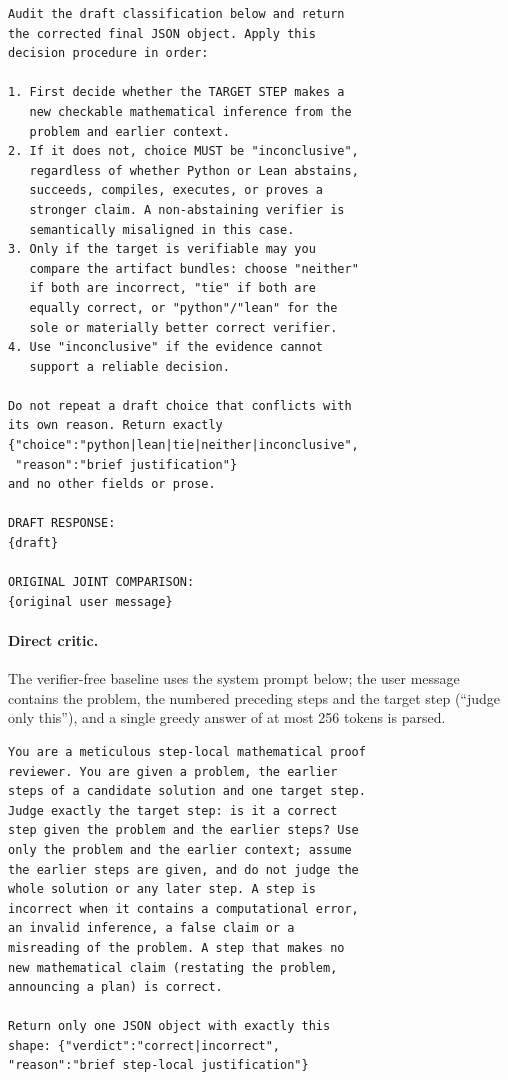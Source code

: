 \begin{small}
\begin{verbatim}
Audit the draft classification below and return
the corrected final JSON object. Apply this
decision procedure in order:

1. First decide whether the TARGET STEP makes a
   new checkable mathematical inference from the
   problem and earlier context.
2. If it does not, choice MUST be "inconclusive",
   regardless of whether Python or Lean abstains,
   succeeds, compiles, executes, or proves a
   stronger claim. A non-abstaining verifier is
   semantically misaligned in this case.
3. Only if the target is verifiable may you
   compare the artifact bundles: choose "neither"
   if both are incorrect, "tie" if both are
   equally correct, or "python"/"lean" for the
   sole or materially better correct verifier.
4. Use "inconclusive" if the evidence cannot
   support a reliable decision.

Do not repeat a draft choice that conflicts with
its own reason. Return exactly
{"choice":"python|lean|tie|neither|inconclusive",
 "reason":"brief justification"}
and no other fields or prose.

DRAFT RESPONSE:
{draft}

ORIGINAL JOINT COMPARISON:
{original user message}
\end{verbatim}
\end{small}

\paragraph{Direct critic.} The verifier-free baseline uses the system prompt below; the user message contains the problem, the numbered preceding steps and the target step (``judge only this''), and a single greedy answer of at most 256 tokens is parsed.

\begin{small}
\begin{verbatim}
You are a meticulous step-local mathematical proof
reviewer. You are given a problem, the earlier
steps of a candidate solution and one target step.
Judge exactly the target step: is it a correct
step given the problem and the earlier steps? Use
only the problem and the earlier context; assume
the earlier steps are given, and do not judge the
whole solution or any later step. A step is
incorrect when it contains a computational error,
an invalid inference, a false claim or a
misreading of the problem. A step that makes no
new mathematical claim (restating the problem,
announcing a plan) is correct.

Return only one JSON object with exactly this
shape: {"verdict":"correct|incorrect",
"reason":"brief step-local justification"}
\end{verbatim}
\end{small}

